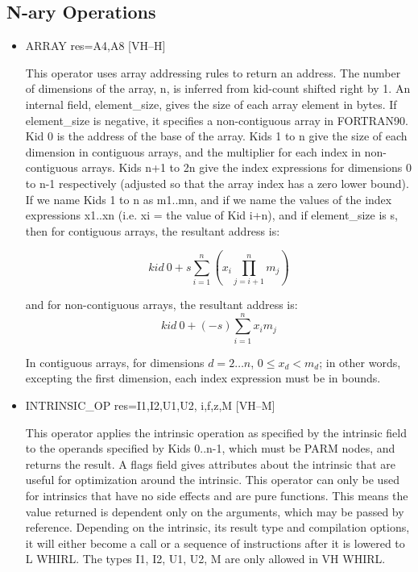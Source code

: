 \documentclass{article}
\begin{document}
\subsection{N-ary Operations}

\begin{itemize}
\item
{}%
ARRAY res=A4,A8 \hfill [VH--H]

This operator uses array addressing rules to return an address.
The number of dimensions of the array, n, is inferred from kid-count
shifted right
by 1. An internal field, element\_size, gives the size of
each array element in bytes. If element\_size is negative, it specifies
a non-contiguous array in FORTRAN90. Kid 0 is the address of the
base of the array. Kids 1 to n give the size of each dimension in
contiguous arrays, and the multiplier for each index in non-contiguous
arrays. Kids n+1 to 2n give the index expressions for dimensions 0
to n-1 respectively (adjusted so that the array index has a zero
lower bound). If we name Kids 1 to n as m1..mn, and if we name the
values of the index expressions x1..xn (i.e. xi = the value of Kid
i+n), and if element\_size is s, then for contiguous arrays, the
resultant address is:

\begin{displaymath}
kid~0 + s \sum^n_{i=1} \left( x_i \prod^n_{j=i+1} m_j\right)
\end{displaymath}

and for non-contiguous arrays, the resultant address is: 
\begin{displaymath}
kid~0 + (-s) \sum^n_{i=1} x_i  m_j
\end{displaymath}

In contiguous arrays, for dimensions $d=2\ldots n$, $0 \leq x_d < m_d$; 
in other words, excepting
the first dimension, each index expression must be in bounds. 

\item
{}%
INTRINSIC\_OP res=I1,I2,U1,U2, i,f,z,M  \hfill [VH--M]

This operator applies the intrinsic operation as specified by the
intrinsic field to the operands specified by Kids 0..n-1, which must
be
%
PARM nodes, and returns the result. A flags field gives attributes
about the intrinsic that are useful for optimization around the
intrinsic. This operator can only be used for intrinsics that have
no side effects and are pure functions. This means the value returned
is dependent only on the arguments, which may be passed by reference.
Depending on the intrinsic, its result type and compilation options,
it will either become a call or a sequence of instructions after it
is lowered to L WHIRL. The types I1, I2, U1, U2, M are only allowed
in VH WHIRL. 


\end{itemize}
\end{document}
